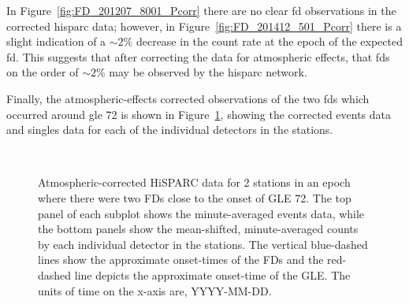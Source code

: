In Figure~\ref{fig:FD_201207_8001_Pcorr} there are no clear \gls{fd} observations in the corrected \gls{hisparc} data; however, in Figure~\ref{fig:FD_201412_501_Pcorr} there is a slight indication of a $\sim2\%$ decrease in the count rate at the epoch of the expected \gls{fd}. This suggests that after correcting the data for atmospheric effects, that \glspl{fd} on the order of $\sim 2\%$ may be observed by the \gls{hisparc} network.

Finally, the atmospheric-effects corrected observations of the two \glspl{fd} which occurred around \gls{gle} 72 is shown in Figure~\ref{fig:FD_GLE72_Pcorr}, showing the corrected events data and singles data for each of the individual detectors in the stations.

\begin{figure}[ht]
	\centering
	 \\
	
	
	\caption{Atmospheric-corrected HiSPARC data for 2 stations in an epoch where there were two FDs close to the onset of GLE 72. The top panel of each subplot shows the minute-averaged events data, while the bottom panels show the mean-shifted, minute-averaged counts by each individual detector in the stations. The vertical blue-dashed lines show the approximate onset-times of the FDs and the red-dashed line depicts the approximate onset-time of the GLE. The units of time on the x-axis are, YYYY-MM-DD.}
	\label{fig:FD_GLE72_Pcorr}
\end{figure}

